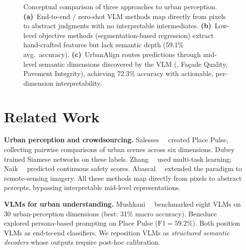 \documentclass[runningheads]{llncs}
\begin{document}
\begin{figure}[t]
{%
}
\caption{Conceptual comparison of three approaches to urban perception.
\textbf{(a)}~End-to-end / zero-shot VLM methods map directly from pixels to abstract judgments with no interpretable intermediates.
\textbf{(b)}~Low-level objective methods (segmentation-based regression) extract hand-crafted features but lack semantic depth (59.1\% avg.\ accuracy).
\textbf{(c)}~UrbanAlign routes predictions through mid-level semantic dimensions discovered by the VLM (\eg, Fa\c{c}ade Quality, Pavement Integrity), achieving 72.3\% accuracy with actionable, per-dimension interpretability.}
\label{fig:comparison}
\end{figure}

\section{Related Work}
\label{sec:related}

\noindent\textbf{Urban perception and crowdsourcing.}
Salesses~\etal~\cite{salesses2013collaborative} created Place Pulse, collecting pairwise comparisons of urban scenes across six dimensions.
Dubey~\etal~\cite{dubey2016deep} trained Siamese networks on these labels.
Zhang~\etal~\cite{zhang2018measuring} used multi-task learning; Naik~\etal~\cite{naik2014streetscore} predicted continuous safety scores.
Abascal~\etal~\cite{abascal2024correlation} extended the paradigm to remote-sensing imagery.
All these methods map directly from pixels to abstract percepts, bypassing interpretable mid-level representations.

\smallskip\noindent\textbf{VLMs for urban understanding.}
Mushkani~\etal~\cite{mushkani2025llm} benchmarked eight VLMs on 30 urban-perception dimensions (best: 31\% macro accuracy).
Beneduce~\etal~\cite{beneduce2025exploring} explored persona-based prompting on Place Pulse ($\text{F1}{=}59.2$\%).
Both position VLMs as end-to-end classifiers.
We reposition VLMs as \emph{structured semantic decoders} whose outputs require post-hoc calibration.
\end{document}
